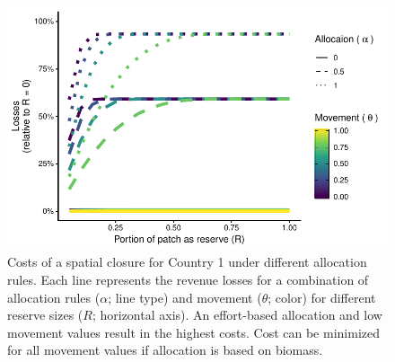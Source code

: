 \documentclass[12pt]{article}
\begin{document}
\begin{figure}[htbp]
\centering
\includegraphics{img/allocation_cost_plot.pdf}
\caption{\label{fig:allocation_cost_plot}Costs of a spatial closure for Country 1 under different allocation rules. Each line represents the revenue losses for a combination of allocation rules ($\alpha$; line type) and movement ($\theta$; color) for different reserve sizes ($R$; horizontal axis). An effort-based allocation and low movement values result in the highest costs. Cost can be minimized for all movement values if allocation is based on biomass.}
\end{figure}
\end{document}
